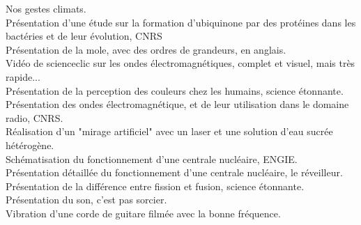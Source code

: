 
{\large {}}
\bigskip

Nos gestes climats.
\\[22pt]

Présentation d'une étude sur la formation d'ubiquinone par des protéines dans les bactéries et de leur évolution, CNRS
\\[8pt]

Présentation de la mole, avec des ordres de grandeurs, en anglais.
\\[22pt]


Vidéo de scienceclic sur les ondes électromagnétiques, complet et visuel, mais très rapide...
\\[22pt]

Présentation de la perception des couleurs chez les humains, science étonnante.
\\[22pt]

Présentation des ondes électromagnétique, et de leur utilisation dans le domaine radio, CNRS.
\\[8pt]

Réalisation d'un "mirage artificiel" avec un laser et une solution d'eau sucrée hétérogène.
\\[22pt]


Schématisation du fonctionnement d'une centrale nucléaire, ENGIE.
\\[22pt]

Présentation détaillée du fonctionnement d'une centrale nucléaire, le réveilleur.
\\[22pt]

Présentation de la différence entre fission et fusion, science étonnante.
\\[22pt]


Présentation du son, c'est pas sorcier.
\\[22pt]

Vibration d'une corde de guitare filmée avec la bonne fréquence.
\\[22pt]